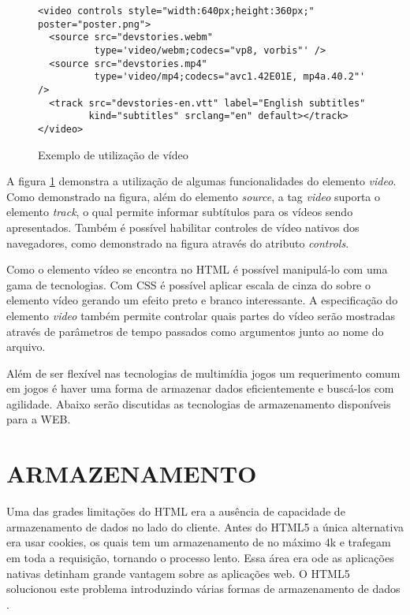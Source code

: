 \begin{figure}
\centering
\begin{verbatim}
<video controls style="width:640px;height:360px;" poster="poster.png">
  <source src="devstories.webm" 
          type='video/webm;codecs="vp8, vorbis"' />
  <source src="devstories.mp4" 
          type='video/mp4;codecs="avc1.42E01E, mp4a.40.2"' />
  <track src="devstories-en.vtt" label="English subtitles" 
         kind="subtitles" srclang="en" default></track>
</video>
\end{verbatim}
\caption{Exemplo de utilização de vídeo}
\label{fig:video}
\end{figure}

A figura \ref{fig:video} demonstra a utilização de algumas
funcionalidades do elemento \textit{video}. Como demonstrado na figura,
além do elemento \textit{source}, a tag \textit{video} suporta o
elemento \textit{track}, o qual permite informar subtítulos para os
vídeos sendo apresentados. Também é possível habilitar controles
de vídeo nativos dos navegadores, como demonstrado na figura através do 
atributo \textit{controls}.

Como o elemento vídeo se encontra no HTML é possível manipulá-lo com
uma gama de tecnologias. Com CSS é possível aplicar escala de cinza do
sobre o elemento vídeo gerando um efeito preto e branco interessante.
A especificação do elemento \textit{video} também permite controlar
quais partes do vídeo serão mostradas através de parâmetros de tempo
passados como argumentos junto ao nome do arquivo.

Além de ser flexível nas tecnologias de multimídia jogos um
requerimento comum em jogos é haver uma forma de armazenar dados
eficientemente e buscá-los com agilidade. Abaixo serão discutidas as
tecnologias de armazenamento disponíveis para a WEB.
\section{ARMAZENAMENTO}
Uma das grades limitações do HTML era a ausência de capacidade de
armazenamento de dados no lado do cliente. Antes do HTML5 a única
alternativa era usar cookies, os quais tem um armazenamento de no
máximo 4k e trafegam em toda a requisição, tornando o processo lento.
Essa área era ode as aplicações nativas detinham grande vantagem
sobre as aplicações web. O HTML5 solucionou este problema introduzindo
várias formas de armazenamento de dados \autocite{html5Tradeoffs}.

